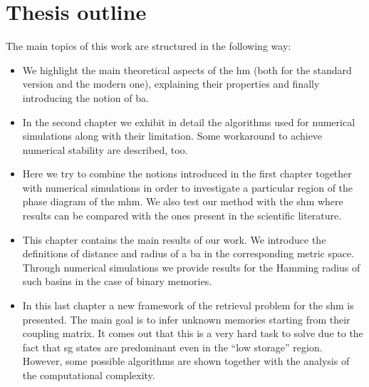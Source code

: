 \documentclass[\rootdir/main.tex]{subfiles}
\begin{document}
\section*{Thesis outline}
The main topics of this work are structured in the following way:
\begin{itemize}
    \item[\Cref{chap:hopfield}] We highlight the main theoretical aspects of the \acrlong{hm} (both for the standard version and the modern one), explaining their properties and finally introducing the notion of \acrlong{ba}.
    
    \item[\Cref{chap:numerical_sim}] In the second chapter we exhibit in detail the algorithms used for numerical simulations along with their limitation. Some workaround to achieve numerical stability are described, too.
    
    \item[\Cref{chap:phase_diagram}] Here we try to combine the notions introduced in the first chapter together with numerical simulations in order to investigate a particular region of the phase diagram of the \acrlong{mhm}. We also test our method with the \acrlong{shm} where results can be compared with the ones present in the scientific literature.
    
    \item[\Cref{chap:radius}] This chapter contains the main results of our work. We introduce the definitions of distance and radius of a \acrlong{ba} in the corresponding metric space. Through numerical simulations we provide results for the Hamming radius of such basins in the case of binary memories.
    
    \item[\Cref{chap:fact}] In this last chapter a new framework of the retrieval problem for the \acrlong{shm} is presented. The main goal is to infer unknown memories starting from their coupling matrix. It comes out that this is a very hard task to solve due to the fact that \acrlong{sg} states are predominant even in the ``low storage'' region. However, some possible algorithms are shown together with the analysis of the computational complexity.
\end{itemize}

\subbibliography %
\end{document}

